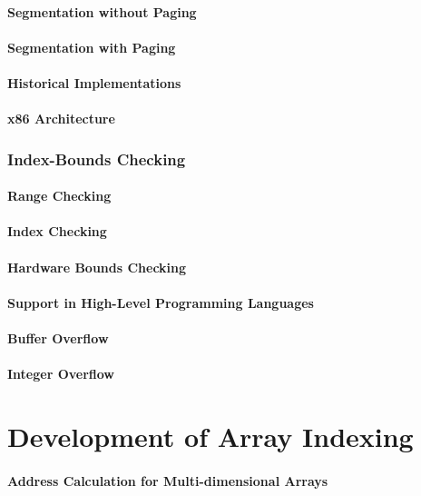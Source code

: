\documentclass[12pt, oneside]{book}
\begin{document}
	\subsubsection{Segmentation without Paging}
	\subsubsection{Segmentation with Paging}
	\subsubsection{Historical Implementations}
	\subsubsection{x86 Architecture}
	\subsection{Index-Bounds Checking}
	\subsubsection{Range Checking}
	\subsubsection{Index Checking}
	\subsubsection{Hardware Bounds Checking}
	\subsubsection{Support in High-Level Programming Languages}
	\subsubsection{Buffer Overflow}
	\subsubsection{Integer Overflow}
	\chapter{Development of Array Indexing}
	\subsubsection{Address Calculation for Multi-dimensional Arrays}
\end{document}
